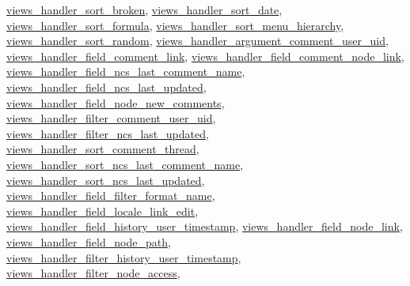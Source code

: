 \hyperlink{classviews__handler__sort__broken_6298719637ac590b81496b4487b573ea}{views\_\-handler\_\-sort\_\-broken}, \hyperlink{classviews__handler__sort__date_3d3680d96fee82a746bac50c051016a8}{views\_\-handler\_\-sort\_\-date}, \hyperlink{classviews__handler__sort__formula_208dff453ab94f55000e8027ed3c8588}{views\_\-handler\_\-sort\_\-formula}, \hyperlink{classviews__handler__sort__menu__hierarchy_04fd6337ac7ec486789586b65cf545fd}{views\_\-handler\_\-sort\_\-menu\_\-hierarchy}, \hyperlink{classviews__handler__sort__random_eaf6fcc03c9d1a0f86a77b9e5314229a}{views\_\-handler\_\-sort\_\-random}, \hyperlink{classviews__handler__argument__comment__user__uid_081c8766297cd7051693061f32207709}{views\_\-handler\_\-argument\_\-comment\_\-user\_\-uid}, \hyperlink{classviews__handler__field__comment__link_c19c2cedce77bfa9490624df9cd1eac2}{views\_\-handler\_\-field\_\-comment\_\-link}, \hyperlink{classviews__handler__field__comment__node__link_f48614fab00f4f6b8ec7e68a3d352b20}{views\_\-handler\_\-field\_\-comment\_\-node\_\-link}, \hyperlink{classviews__handler__field__ncs__last__comment__name_5394581513de0ee85a28aef8de302842}{views\_\-handler\_\-field\_\-ncs\_\-last\_\-comment\_\-name}, \hyperlink{classviews__handler__field__ncs__last__updated_9fdf82c20960c14abf4aaa37c578b299}{views\_\-handler\_\-field\_\-ncs\_\-last\_\-updated}, \hyperlink{classviews__handler__field__node__new__comments_b49cfad0c25d081f0ee70e2e0d0db809}{views\_\-handler\_\-field\_\-node\_\-new\_\-comments}, \hyperlink{classviews__handler__filter__comment__user__uid_5b649bd04038ac8ed577410ad54ad5b0}{views\_\-handler\_\-filter\_\-comment\_\-user\_\-uid}, \hyperlink{classviews__handler__filter__ncs__last__updated_fdcfcb18506212eb4b5df8b19971ff48}{views\_\-handler\_\-filter\_\-ncs\_\-last\_\-updated}, \hyperlink{classviews__handler__sort__comment__thread_6ea2c9fdba530fd022c1eafd5b0c4cea}{views\_\-handler\_\-sort\_\-comment\_\-thread}, \hyperlink{classviews__handler__sort__ncs__last__comment__name_23a0eb15347f118155df094a2cadd249}{views\_\-handler\_\-sort\_\-ncs\_\-last\_\-comment\_\-name}, \hyperlink{classviews__handler__sort__ncs__last__updated_05d2ef9eb8727ee81915b34254d99355}{views\_\-handler\_\-sort\_\-ncs\_\-last\_\-updated}, \hyperlink{classviews__handler__field__filter__format__name_3032499c14945a87535f1fdfbea57feb}{views\_\-handler\_\-field\_\-filter\_\-format\_\-name}, \hyperlink{classviews__handler__field__locale__link__edit_da85b88e681ca38a7c7d66deb133ae65}{views\_\-handler\_\-field\_\-locale\_\-link\_\-edit}, \hyperlink{classviews__handler__field__history__user__timestamp_bd6ff7a6d51f75781cf6ea6288612c07}{views\_\-handler\_\-field\_\-history\_\-user\_\-timestamp}, \hyperlink{classviews__handler__field__node__link_2c9b646801f273970403fea5ac4621b0}{views\_\-handler\_\-field\_\-node\_\-link}, \hyperlink{classviews__handler__field__node__path_59474fa6e78296b5f0c2aca6a951907e}{views\_\-handler\_\-field\_\-node\_\-path}, \hyperlink{classviews__handler__filter__history__user__timestamp_c7499e60ca61853a3cd37fcbaa3c0618}{views\_\-handler\_\-filter\_\-history\_\-user\_\-timestamp}, \hyperlink{classviews__handler__filter__node__access_b7f054a6a94abf2f41ce70fd40cf2e5e}{views\_\-handler\_\-filter\_\-node\_\-access}, 